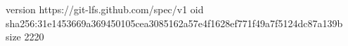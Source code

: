 version https://git-lfs.github.com/spec/v1
oid sha256:31e1453669a369450105cea3085162a57e4f1628ef771f49a7f5124dc87a139b
size 2220
